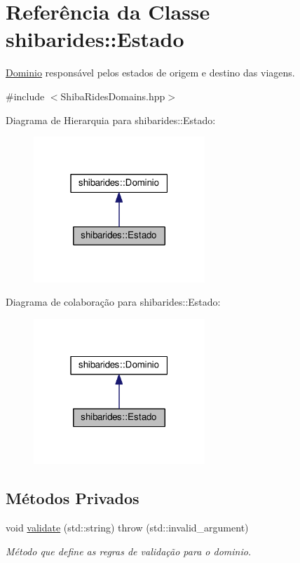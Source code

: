 \hypertarget{classshibarides_1_1Estado}{}\section{Referência da Classe shibarides\+:\+:Estado}
\label{classshibarides_1_1Estado}


\hyperlink{classshibarides_1_1Dominio}{Dominio} responsável pelos estados de origem e destino das viagens.  




{\ttfamily \#include $<$Shiba\+Rides\+Domains.\+hpp$>$}



Diagrama de Hierarquia para shibarides\+:\+:Estado\+:\nopagebreak
\begin{figure}[H]
\begin{center}
\leavevmode
\includegraphics[width=183pt]{classshibarides_1_1Estado__inherit__graph}
\end{center}
\end{figure}


Diagrama de colaboração para shibarides\+:\+:Estado\+:\nopagebreak
\begin{figure}[H]
\begin{center}
\leavevmode
\includegraphics[width=183pt]{classshibarides_1_1Estado__coll__graph}
\end{center}
\end{figure}
\subsection*{Métodos Privados}
\begin{DoxyCompactItemize}
\item 
void \hyperlink{classshibarides_1_1Estado_a87dff745c1b1f487eae4bd4461e8a1ef}{validate} (std\+::string)  throw (std\+::invalid\+\_\+argument)
\begin{DoxyCompactList}\small\item\em Método que define as regras de validação para o dominio. \end{DoxyCompactList}\end{DoxyCompactItemize}
